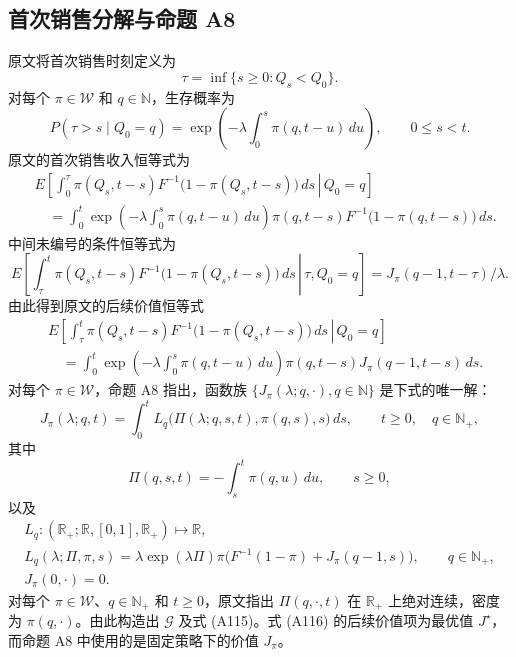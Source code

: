 \documentclass{article}
\begin{document}
\subsection*{首次销售分解与命题 A8}
原文将首次销售时刻定义为
\[
\tau=\inf\{s\geq0:Q_s<Q_0\}.
\]
对每个 $\pi\in\mathcal W$ 和 $q\in\mathbb N$，生存概率为
\begin{equation}
P(\tau>s\mid Q_0=q)
=\exp\left(-\lambda\int_0^s\pi(q,t-u)\,du\right),
\qquad 0\leq s<t.
\tag{A110}
\end{equation}
原文的首次销售收入恒等式为
\begin{equation}
\begin{aligned}
&E\left[\left.\int_0^\tau
\pi(Q_s,t-s)F^{-1}\bigl(1-\pi(Q_s,t-s)\bigr)\,ds
\,\right|\,Q_0=q\right]\\
&\quad=\int_0^t
\exp\left(-\lambda\int_0^s\pi(q,t-u)\,du\right)
\pi(q,t-s)F^{-1}\bigl(1-\pi(q,t-s)\bigr)\,ds.
\end{aligned}\tag{A111}
\end{equation}
中间未编号的条件恒等式为
\[
E\left[\left.\int_\tau^t
\pi(Q_s,t-s)F^{-1}\bigl(1-\pi(Q_s,t-s)\bigr)\,ds
\,\right|\,\tau,Q_0=q\right]
=J_\pi(q-1,t-\tau)/\lambda.
\]
由此得到原文的后续价值恒等式
\begin{equation}
\begin{aligned}
&E\left[\left.\int_\tau^t
\pi(Q_s,t-s)F^{-1}\bigl(1-\pi(Q_s,t-s)\bigr)\,ds
\,\right|\,Q_0=q\right]\\
&\quad=\int_0^t
\exp\left(-\lambda\int_0^s\pi(q,t-u)\,du\right)
\pi(q,t-s)J_\pi(q-1,t-s)\,ds.
\end{aligned}\tag{A112}
\end{equation}
对每个 $\pi\in\mathcal W$，命题 A8 指出，函数族
$\{J_\pi(\lambda;q,\cdot),q\in\mathbb N\}$ 是下式的唯一解：
\begin{equation}
J_\pi(\lambda;q,t)
=\int_0^t L_q\bigl(\Pi(\lambda;q,s,t),\pi(q,s),s\bigr)\,ds,
\qquad t\geq0,\quad q\in\mathbb N_+,
\tag{A113}
\end{equation}
其中
\begin{equation}
\Pi(q,s,t)=-\int_s^t\pi(q,u)\,du,
\qquad s\geq0,
\tag{A114}
\end{equation}
以及
\[
\begin{gathered}
L_q:(\mathbb R_+;\mathbb R,[0,1],\mathbb R_+)\longmapsto\mathbb R,\\
L_q(\lambda;\Pi,\pi,s)
=\lambda\exp(\lambda\Pi)\pi
\bigl(F^{-1}(1-\pi)+J_\pi(q-1,s)\bigr),
\qquad q\in\mathbb N_+,\\
J_\pi(0,\cdot)=0.
\end{gathered}
\]
对每个 $\pi\in\mathcal W$、$q\in\mathbb N_+$ 和 $t\geq0$，原文指出 $\Pi(q,\cdot,t)$ 在 $\mathbb R_+$ 上绝对连续，密度为 $\pi(q,\cdot)$。由此构造出 $\mathcal G$ 及式 (A115)。式 (A116) 的后续价值项为最优值 $J^\star$，而命题 A8 中使用的是固定策略下的价值 $J_\pi$。
\end{document}
